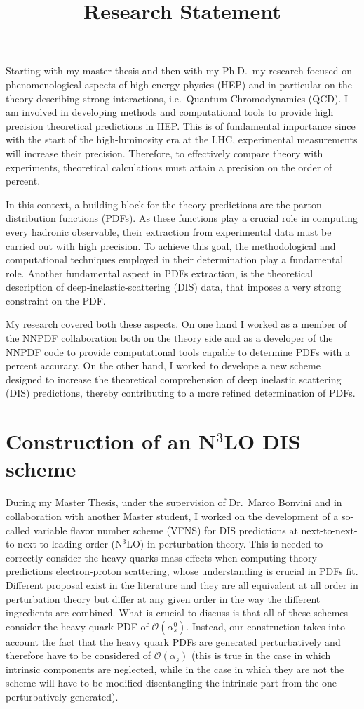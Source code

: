\documentclass[11pt,a4paper]{moderncv}        %
\title{Research Statement}
\begin{document}
\makecvtitle

Starting with my master thesis and then with my Ph.D.\ my research focused on phenomenological aspects of high energy physics (HEP)
and in particular on the theory describing strong interactions, i.e.\ Quantum Chromodynamics (QCD).
I am involved in developing methods and computational tools to provide high precision theoretical predictions in HEP.
This is of fundamental importance since with the start of the high-luminosity era at the LHC, experimental measurements will increase
their precision.
Therefore, to effectively compare theory with experiments, theoretical calculations must attain a precision on the order of percent.

In this context, a building block for the theory predictions are the parton distribution functions (PDFs).
As these functions play a crucial role in computing every hadronic observable, their extraction from
experimental data must be carried out with high precision.
To achieve this goal, the methodological and computational techniques employed in their determination play a fundamental role. 
Another fundamental aspect in PDFs extraction, is the theoretical description of deep-inelastic-scattering (DIS) data,
that imposes a very strong constraint on the PDF.

My research covered both these aspects.
On one hand I worked as a member of the NNPDF collaboration both on the theory side and as a developer of the NNPDF code to provide
computational tools capable to determine PDFs with a percent accuracy.
On the other hand, I worked to develope a new scheme designed to increase the theoretical comprehension of deep inelastic scattering
(DIS) predictions, thereby contributing to a more refined determination of PDFs.

\section{Construction of an N$^3$LO DIS scheme}

During my Master Thesis, under the supervision of Dr.\ Marco Bonvini and in collaboration with another Master student,
I worked on the development of a so-called variable flavor number scheme (VFNS) for DIS predictions at
next-to-next-to-next-to-leading order (N$^3$LO) in perturbation theory.
This is needed to correctly consider the heavy quarks mass effects when computing theory predictions electron-proton scattering,
whose understanding is crucial in PDFs fit.
Different proposal exist in the literature and they are all equivalent at all order in perturbation theory but differ at any given
order in the way the different ingredients are combined.
What is crucial to discuss is that all of these schemes consider the heavy quark PDF of $\mathcal{O}(\alpha_s^0)$.
Instead, our construction takes into account the fact that the heavy quark PDFs are generated
perturbatively and therefore have to be considered of $\mathcal{O}(\alpha_s)$ (this is true in the case in which intrinsic components are neglected, while in the case in which they are not the scheme will
have to be modified disentangling the intrinsic part from the one perturbatively generated).
\end{document}

